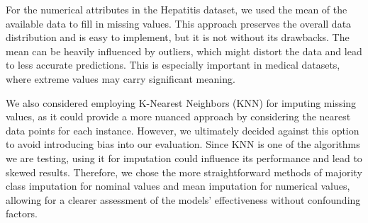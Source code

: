 For the numerical attributes in the Hepatitis dataset, we used the mean of the available data to fill in missing values.
This approach preserves the overall data distribution and is easy to implement, but it is not without its drawbacks.
The mean can be heavily influenced by outliers, which might distort the data and lead to less accurate predictions.
This is especially important in medical datasets, where extreme values may carry significant meaning.

We also considered employing K-Nearest Neighbors (KNN) for imputing missing values, as it could provide a more nuanced approach by considering the nearest data points for each instance.
However, we ultimately decided against this option to avoid introducing bias into our evaluation.
Since KNN is one of the algorithms we are testing, using it for imputation could influence its performance and lead to skewed results.
Therefore, we chose the more straightforward methods of majority class imputation for nominal values and mean imputation for numerical values, allowing for a clearer assessment of the models’ effectiveness without confounding factors.


